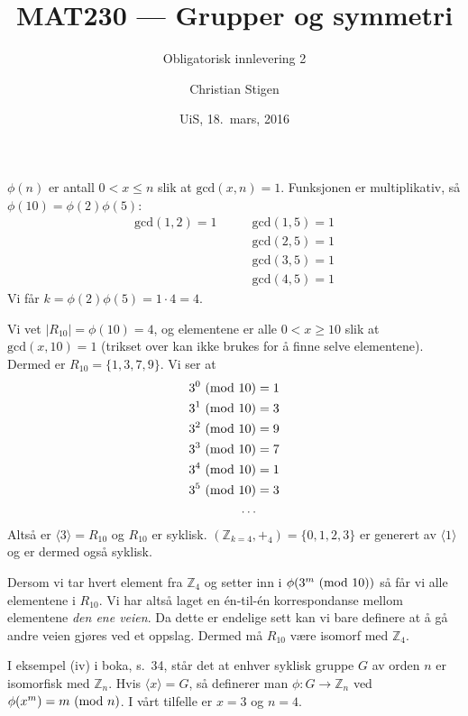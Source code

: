 \documentclass[a4paper,norsk,twocolumn,12pt]{article}
\title{MAT230 --- Grupper og symmetri}
\subtitle{Obligatorisk innlevering 2}
\author{Christian Stigen}
\date{UiS, 18.~mars, 2016}
\begin{document}
\maketitle


$\phi{(n)}$ er antall $0 < x \leqslant n$ slik at $\text{gcd}{(x,n)} = 1$.
Funksjonen er multiplikativ, så $\phi{(10)} = \phi{(2)}\phi{(5)}$:
\begin{align*}
  \text{gcd}(1, 2) = 1 & \qquad\text{gcd}(1, 5) = 1 \\
                       & \qquad\text{gcd}(2, 5) = 1 \\
                       & \qquad\text{gcd}(3, 5) = 1 \\
                       & \qquad\text{gcd}(4, 5) = 1
\end{align*}
Vi får $k = \phi{(2)}\phi{(5)} = 1\cdot4 =4 $.

Vi vet $|R_10| = \phi{(10)} = 4$, og elementene er alle $0<x\geqslant 10$ slik
at $\text{gcd}(x,10)=1$ (trikset over kan ikke brukes for å finne selve
elementene). Dermed er $R_{10} = \{ 1,3,7,9 \}$. Vi ser at
\begin{align*}
  3^0 \ (\text{mod}\ 10) &= 1 \\
  3^1 \ (\text{mod}\ 10) &= 3 \\
  3^2 \ (\text{mod}\ 10) &= 9 \\
  3^3 \ (\text{mod}\ 10) &= 7 \\
  3^4 \ (\text{mod}\ 10) &= 1 \\
  3^5 \ (\text{mod}\ 10) &= 3 \\
  \ldots
\end{align*}
Altså er $\langle 3 \rangle = R_{10}$ og $R_{10}$ er syklisk. 
$(\mathbb{Z}_{k=4}, +_4) = \{0,1,2,3\}$ er generert av $\langle 1 \rangle$ og
er dermed også syklisk.

Dersom vi tar hvert element fra $\mathbb{Z}_4$ og setter inn i
$\phi{(3^m\ (\text{mod}\ 10))}$ så får vi alle elementene i $R_{10}$. Vi har altså laget
en én-til-én korrespondanse mellom elementene \textit{den ene veien}. Da dette
er endelige sett kan vi bare definere at å gå andre veien gjøres ved et
oppslag. Dermed må $R_{10}$ være isomorf med $\mathbb{Z}_4$.

I eksempel (iv) i boka, s.~34, står det at enhver syklisk gruppe $G$ av orden
$n$ er isomorfisk med $\mathbb{Z}_n$. Hvis $\langle x \rangle = G$, så
definerer man $\phi\colon G \rightarrow \mathbb{Z}_n$ ved $\phi{(x^m)} = m
\ (\text{mod}\ n)$. I vårt tilfelle er $x=3$ og $n=4$.

\end{document}
